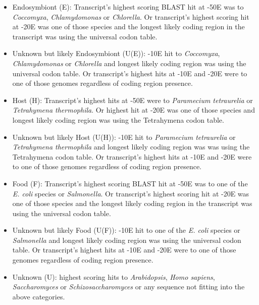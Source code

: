 \documentclass[a4paper,11pt]{article}
\begin{document}
\begin{itemize}
  \item Endosymbiont (E): Transcript's highest scoring BLAST hit at -50E was to \textit{Coccomyxa}, \textit{Chlamydomonas} or \textit{Chlorella}.  Or transcript's highest scoring hit at -20E was one of those species and the longest likely coding region in the transcript was using the universal codon table. 
  \item Unknown but likely Endosymbiont (U(E)): -10E hit to \textit{Coccomyxa}, \textit{Chlamydomonas} or \textit{Chlorella} and longest likely coding region was using the universal codon table. Or transcript's highest hits at -10E and -20E were to one of those genomes regardless of coding region presence.
  \item Host (H): Transcript's highest hits at -50E were to \textit{Paramecium tetraurelia} or \textit{Tetrahymena thermophila}.  Or highest hit at -20E was one of those species and longest likely coding region was using the Tetrahymena codon table.
  \item Unknown but likely Host (U(H)): -10E hit to \textit{Paramecium tetraurelia} or \textit{Tetrahymena thermophila} and longest likely coding region was was using the Tetrahymena codon table. Or transcript's highest hits at -10E and -20E were to one of those genomes regardless of coding region presence.
  \item Food (F): Transcript's highest scoring BLAST hit at -50E was to one of the \textit{E. coli} species or \textit{Salmonella}.  Or transcript's highest scoring hit at -20E was one of those species and the longest likely coding region in the transcript was using the universal codon table.
  \item Unknown but likely Food (U(F)): -10E hit to one of the \textit{E. coli} species or \textit{Salmonella} and longest likely coding region was using the universal codon table. Or transcript's highest hits at -10E and -20E were to one of those genomes regardless of coding region presence.
  \item Unknown (U): highest scoring hits to \textit{Arabidopsis}, \textit{Homo sapiens}, \textit{Saccharomyces} or \textit{Schizosaccharomyces} or any sequence not fitting into the above categories.
\end{itemize}
\end{document}
